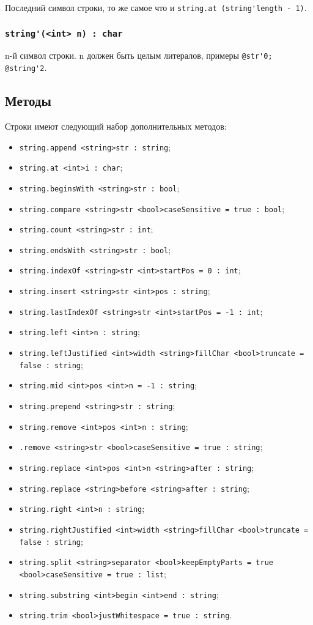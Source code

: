 \documentclass[a4paper, 14pt]{extarticle}
\newenvironment{icItems}
	{ \begin{itemize} [noitemsep,nolistsep] }
	{ \end{itemize} }
\begin{document}
Последний символ строки, то же самое что и \lstinline|string.at (string'length - 1)|.

\subsubsection{\lstinline|string'(<int> n) : char|}

n-й символ строки. n должен быть целым литералов, примеры \lstinline|@str'0; @string'2|.

\subsection{Методы}

Строки имеют следующий набор дополнительных методов:
\begin{icItems}
\item
	\lstinline|string.append <string>str : string|;
\item
	\lstinline|string.at <int>i : char|;
\item
	\lstinline|string.beginsWith <string>str : bool|;
\item
	\lstinline|string.compare <string>str <bool>caseSensitive = true : bool|;
\item
	\lstinline|string.count <string>str : int|;
\item
	\lstinline|string.endsWith <string>str : bool|;
\item
	\lstinline|string.indexOf <string>str <int>startPos = 0 : int|;
\item
	\lstinline|string.insert <string>str <int>pos : string|;
\item
	\lstinline|string.lastIndexOf <string>str <int>startPos = -1 : int|;
\item
	\lstinline|string.left <int>n : string|;
\item
	\lstinline|string.leftJustified <int>width <string>fillChar <bool>truncate = false : string|;
\item
	\lstinline|string.mid <int>pos <int>n = -1 : string|;
\item
	\lstinline|string.prepend <string>str : string|;
\item
	\lstinline|string.remove <int>pos <int>n : string|;
\item
	\lstinline|.remove <string>str <bool>caseSensitive = true : string|;
\item
	\lstinline|string.replace <int>pos <int>n <string>after : string|;
\item
	\lstinline|string.replace <string>before <string>after : string|;
\item
	\lstinline|string.right <int>n : string|;
\item
	\lstinline|string.rightJustified <int>width <string>fillChar <bool>truncate = false : string|;
\item
	\lstinline|string.split <string>separator <bool>keepEmptyParts = true <bool>caseSensitive = true : list|;
\item
	\lstinline|string.substring <int>begin <int>end : string|;
\item
	\lstinline|string.trim <bool>justWhitespace = true : string|.
\end{icItems}
\end{document}
